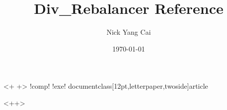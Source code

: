 <+	+>	!comp!	!exe!
%
documentclass[12pt,letterpaper,twoside]{article}
\usepackage[dvips]{graphics}
 \usepackage{multirow}
\usepackage[hmargin={0.8in,0.8in}]{geometry}
\usepackage{amscd, epsfig,amssymb,euscript,subfigure}
 \usepackage{amsmath}
\usepackage{listings}
\usepackage{subfig}
\usepackage{pgf,pgfarrows,pgfnodes,pgfautomata,pgfheaps,pgfshade}
\usepackage{tikz}
\usepackage{graphicx}


\title{Div\_Rebalancer Reference}
 \author{Nick Yang Cai}
 \date{\today}
\maketitle
\medskip
\medskip
\medskip
\tableofcontents  %

\newpage

<++>

